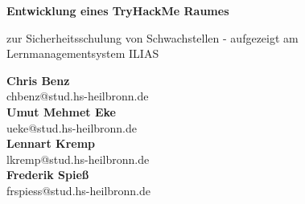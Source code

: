 \documentclass[10pt, a4paper,onecolumn ,titlepage]{article}
\begin{document}
    \begin{titlepage}
        \begin{center}

            \vspace*{1cm}

            {\large \textbf{Entwicklung eines TryHackMe Raumes}}

            \vspace{0.5cm}
            zur Sicherheitsschulung von Schwachstellen - aufgezeigt am Lernmanagementsystem ILIAS

            \vspace{1.5cm}

            \textbf{Chris Benz} \\
            \small{chbenz@stud.hs-heilbronn.de}
            \\
            \vspace{0.2cm}
            \textbf{Umut Mehmet Eke}\\
            \small{ueke@stud.hs-heilbronn.de}
            \\
            \vspace{0.2cm}
            \textbf{Lennart Kremp} \\
            \small{lkremp@stud.hs-heilbronn.de}
            \\
            \vspace{0.2cm}
            \textbf{Frederik Spieß}\\
            \small{frspiess@stud.hs-heilbronn.de}


            \vfill


\end{center}
\end{titlepage}
\end{document}
